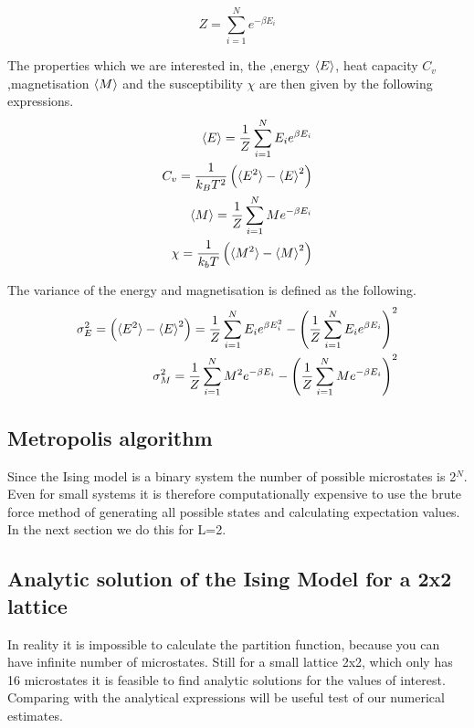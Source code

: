 \begin{equation}\label{eq:partFunc}
  Z = \sum_{i=1}^{N} e^{-\beta E_i}
\end{equation}

The properties which we are interested in, the ,energy $\braket{E}$, heat
capacity $C_v$,magnetisation $\braket{M}$ and the susceptibility $\chi$ are then given
by the following expressions.
\begin{eqnarray}
  \braket{E} = \frac{1}{Z} \sum_{i=1}^N E_i e^{\beta E_i} \\
  C_v = \frac{1}{k_B T^2}\left(\braket{E^2} - \braket{E}^2 \right) \\
  \braket{M} = \frac{1}{Z} \sum_{i=1}^{N} M e^{-\beta E_i} \\
  \chi = \frac{1}{k_b T}\left(\braket{M^2}- \braket{M}^2\right)
\end{eqnarray}

The variance of the energy and magnetisation is defined as the following.
\begin{eqnarray}
  \sigma_E^{2} = \left(\braket{E^2} - \braket{E}^2 \right) = \frac{1}{Z}
  \sum_{i=1}^N E_i e^{\beta E_i^2} - \left(\frac{1}{Z} \sum_{i=1}^N E_i e^{\beta
  E_i}\right)^2  \\
  \sigma_M^{2} = \frac{1}{Z} \sum_{i=1}^{N} M^2 e^{-\beta E_i}  - \left(\frac{1}{Z} \sum_{i=1}^{N} M e^{-\beta E_i}  \right)^2
\end{eqnarray}


\subsection{Metropolis algorithm}


Since the Ising model is a binary system the number of possible microstates is
2$^{N}$. Even for small systems it is therefore computationally expensive to use
the brute force method of generating all possible states and calculating
expectation values. In the next section we do this for L=2.

\subsection{Analytic solution of the Ising Model for a 2x2 lattice}
In reality it is impossible to calculate the partition function, because you can
have infinite number of microstates. Still for a small lattice 2x2, which only
has 16 microstates it is
feasible to find analytic solutions for the values of
interest. Comparing with the analytical expressions will be useful test of our
numerical estimates.

